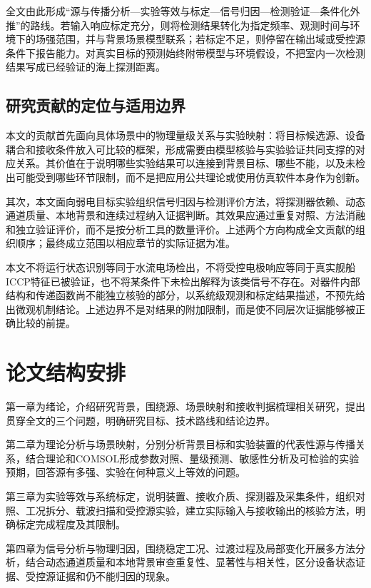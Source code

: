 全文由此形成“源与传播分析—实验等效与标定—信号归因—检测验证—条件化外推”的路线。若输入响应标定充分，则将检测结果转化为指定频率、观测时间与环境下的场强范围，并与背景场景模型联系；若标定不足，则停留在输出域或受控源条件下报告能力。对真实目标的预测始终附带模型与环境假设，不把室内一次检测结果写成已经验证的海上探测距离。

\subsection{研究贡献的定位与适用边界}

本文的贡献首先面向具体场景中的物理量级关系与实验映射：将目标候选源、设备耦合和接收条件放入可比较的框架，形成需要由模型核验与实验验证共同支撑的对应关系。其价值在于说明哪些实验结果可以连接到背景目标、哪些不能，以及未检出可能受到哪些环节限制，而不是把应用公共理论或使用仿真软件本身作为创新。

其次，本文面向弱电目标实验组织信号归因与检测评价方法，将探测器依赖、动态通道质量、本地背景和连续过程纳入证据判断。其效果应通过重复对照、方法消融和独立验证评价，而不是按分析工具的数量评价。上述两个方向构成全文贡献的组织顺序；最终成立范围以相应章节的实际证据为准。

本文不将运行状态识别等同于水流电场检出，不将受控电极响应等同于真实舰船ICCP特征已被验证，也不将某条件下未检出解释为该类信号不存在。对器件内部结构和传递函数尚不能独立核验的部分，以系统级观测和标定结果描述，不预先给出微观机制结论。上述边界不是对结果的附加限制，而是使不同层次证据能够被正确比较的前提。

\section{论文结构安排}

第一章为绪论，介绍研究背景，围绕源、场景映射和接收判据梳理相关研究，提出贯穿全文的三个问题，明确研究目标、技术路线和结论边界。

第二章为理论分析与场景映射，分别分析背景目标和实验装置的代表性源与传播关系，结合理论和COMSOL形成参数对照、量级预测、敏感性分析及可检验的实验预期，回答源有多强、实验在何种意义上等效的问题。

第三章为实验等效与系统标定，说明装置、接收介质、探测器及采集条件，组织对照、工况拆分、载波扫描和受控源实验，建立实际输入与接收输出的核验方法，明确标定完成程度及其限制。

第四章为信号分析与物理归因，围绕稳定工况、过渡过程及局部变化开展多方法分析，结合动态通道质量和本地背景审查重复性、显著性与相关性，区分设备状态证据、受控源证据和仍不能归因的现象。

